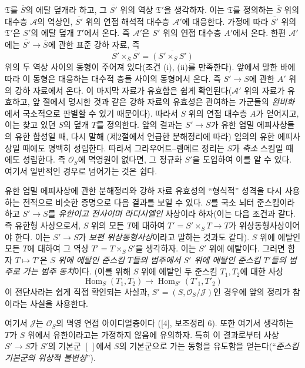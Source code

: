 $\mathfrak T$를 $\overline S$의 에탈 덮개라 하고, 그
$\overline{S'}$ 위의 역상 $\mathfrak T'$을 생각하자. 이는
$\mathfrak T$를 정의하는 $\overline S$ 위의 대수층 $\mathcal A$의
역상인, $\overline{S'}$ 위의 연접 해석적 대수층 $\mathcal A'$에
대응한다. 가정에 따라 $\overline{S'}$ 위의 $\mathfrak T'$은 $S'$의
에탈 덮개 $T'$에서 온다. 즉 $\mathcal A'$은 $S'$ 위의 연접 대수층
$A'$에서 온다. 한편 $\mathcal A'$에는
$\overline{S'}\longrightarrow\overline S$에 관한 표준 강하 자료, 즉
\[
  \overline{S'}\times_{\overline S}\overline{S'}
  =\overline{(S'\times_SS')}
\]
위의 두 역상 사이의 동형이 주어져 있다(조건 (i), (ii)를 만족한다).
앞에서 말한 바에 따라 이 동형은 대응하는 대수적 층들 사이의 동형에서
온다. 즉 $S'\longrightarrow S$에 관한 $A'$ 위의 강하 자료에서 온다.
이 마지막 자료가 유효함은 쉽게 확인된다($\mathcal A'$ 위의 자료가
유효하고, 앞 절에서 명시한 것과 같은 강하 자료의 유효성은 관여하는
가군들의 \emph{완비화}에서 국소적으로 판별할 수 있기 때문이다). 따라서
$S$ 위의 연접 대수층 $A$가 얻어지고, 이는 찾고 있던 $S$의 덮개 $T$를
정의한다. 앞의 결과는 $S'\longrightarrow S$가 유한 엄밀 에피사상들의
유한 합성일 때, 다시 말해 (제2절에서 언급한 분해정리에 따라) 임의의
유한 에피사상일 때에도 명백히 성립한다. 따라서 그라우어트--렘메르 정리는
$S$가 \emph{축소} 스킴일 때에도 성립한다. 즉 $\mathcal O_S$에 멱영원이
없다면, 그 정규화 $S'$을 도입하여 이를 알 수 있다. 여기서 일반적인
경우로 넘어가는 것은 쉽다.

유한 엄밀 에피사상에 관한 분해정리와 강하 자료 유효성의 ``형식적'' 성격을
다시 사용하는 전적으로 비슷한 증명으로 다음 결과를 보일 수 있다.
$S$를 국소 뇌터 준스킴이라 하고 $S'\longrightarrow S$를 \emph{유한이고
전사이며 라디시엘인} 사상이라 하자(이는 다음 조건과 같다. 즉 유한형
사상으로서, $S$ 위의 모든 $T$에 대하여
$T'=S'\times_ST\longrightarrow T$가 위상동형사상이어야 한다. 이는
$S'\longrightarrow S$가 \emph{보편 위상동형사상}이라고 말하는 것과도
같다). $S$ 위에 에탈인 모든 $T$에 대하여 그 역상
$T'=T\times_SS'$을 생각하자. 이는 $S'$ 위에 에탈이다. 그러면 함자
$T\longmapsto T'$은 \emph{$S$ 위에 에탈인 준스킴 $T$들의 범주에서
$S'$ 위에 에탈인 준스킴 $T'$들의 범주로 가는 범주 동치}이다. (이를
위해 $S$ 위에 에탈인 두 준스킴 $T_1,T_2$에 대한 사상
\[
  \operatorname{Hom}_S(T_1,T_2)\longrightarrow
  \operatorname{Hom}_{S'}(T'_1,T'_2)
\]
이 전단사라는 쉽게 직접 확인되는 사실과, $S'=(S,\mathcal O_S/\mathcal J)$인
경우에 앞의 정리가 참이라는 사실을 사용한다.

여기서 $\mathcal J$는 $\mathcal O_S$의 멱영 연접 아이디얼층이다
([4], 보조정리 6). 또한 여기서 생각하는 $T$가 $S$ 위에서 유한이라고는
가정하지 않음에 유의하자. 특히 이 결과로부터 사상
$S'\longrightarrow S$가 $S'$의 기본군 $[\,]$에서 $S$의 기본군으로 가는
동형을 유도함을 얻는다(``\emph{준스킴 기본군의 위상적 불변성}'').

